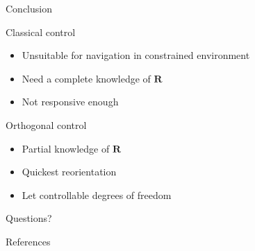\documentclass[10pt, xcolor={usenames, dvipsnames}]{beamer}
\begin{document}
        \begin{frame}{Conclusion}
            \centering
            \begin{minipage}{0.8\textwidth}
                \begin{block}{Classical control}
                    \vspace*{.25cm}
                    \begin{itemize}
                        \item Unsuitable for navigation in constrained environment
                        \item Need a complete knowledge of $\mathbf{R}$
                        \item Not responsive enough
                    \end{itemize}
                \end{block}
                \begin{block}{Orthogonal control}
                    \begin{itemize}
                        \item Partial knowledge of $\mathbf{R}$
                        \item Quickest reorientation
                        \item Let controllable degrees of freedom
                    \end{itemize}
                \end{block}
            \end{minipage}
        \end{frame}
    
    \appendix

    \begin{frame}[standout]
        Questions?
    \end{frame}

    \begin{frame}[allowframebreaks]{References}

        \printbibliography[sorting=nyt]

    \end{frame}

        


\end{document}
